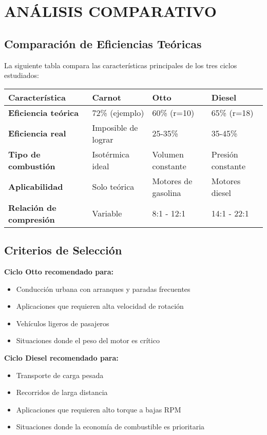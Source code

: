 \documentclass{article}
\begin{document}
\vspace{5mm}

\section*{ANÁLISIS COMPARATIVO}

\subsection*{Comparación de Eficiencias Teóricas}

La siguiente tabla compara las características principales de los tres ciclos estudiados:

\begin{center}
\begin{tabular}{|p{3cm}|p{3cm}|p{3cm}|p{3cm}|}
\hline
\textbf{Característica} & \textbf{Carnot} & \textbf{Otto} & \textbf{Diesel} \\
\hline\hline
\textbf{Eficiencia teórica} & 72\% (ejemplo) & 60\% (r=10) & 65\% (r=18) \\
\hline
\textbf{Eficiencia real} & Imposible de lograr & 25-35\% & 35-45\% \\
\hline
\textbf{Tipo de combustión} & Isotérmica ideal & Volumen constante & Presión constante \\
\hline
\textbf{Aplicabilidad} & Solo teórica & Motores de gasolina & Motores diesel \\
\hline
\textbf{Relación de compresión} & Variable & 8:1 - 12:1 & 14:1 - 22:1 \\
\hline
\end{tabular}
\end{center}

\subsection*{Criterios de Selección}

\textbf{Ciclo Otto recomendado para:}
\begin{itemize}
    \item Conducción urbana con arranques y paradas frecuentes
    \item Aplicaciones que requieren alta velocidad de rotación
    \item Vehículos ligeros de pasajeros
    \item Situaciones donde el peso del motor es crítico
\end{itemize}

\textbf{Ciclo Diesel recomendado para:}
\begin{itemize}
    \item Transporte de carga pesada
    \item Recorridos de larga distancia
    \item Aplicaciones que requieren alto torque a bajas RPM
    \item Situaciones donde la economía de combustible es prioritaria
\end{itemize}
\end{document}
